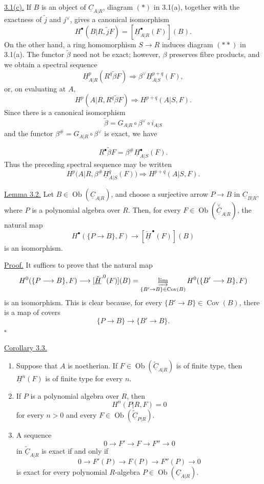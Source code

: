 \underline{3.1(c).} If $B$ is an object of
$\underline C_{A|R}$, diagram $(*)$ in 3.1(a), together with the
exactness of $\widetilde j$ and $j^{\vee}$, gives a canonical
isomorphism
\[
 H^{\bullet}(B|R,\widetilde jF)=
 [\underline H^{\bullet}_{A|R}(F)](B).
\]
On the other hand, a ring homomorphism $S\longrightarrow R$ induces
diagram $(**)$ in 3.1(a). The functor $\widetilde\beta$ need not be
exact; however, $\beta$ preserves fibre products, and we obtain a
spectral sequence
\[
 \underline H^p_{A|R}(R^q\widetilde\beta F)
 \Longrightarrow
 \beta^{\vee}\underline H^{p+q}_{A|S}(F),
\]
or, on evaluating at $A$,
\[
 H^p(A|R,R^q\widetilde\beta F)
 \Longrightarrow H^{p+q}(A|S,F).
\]
Since there is a canonical isomorphism
\[
 \widetilde\beta=
 G_{A|R}\circ\beta^{\vee}\circ i_{A|S}
\]
and the functor
$\beta^{\#}=G_{A|R}\circ\beta^{\vee}$ is exact, we have


\[
 R^{\bullet}\widetilde\beta F=
 \beta^{\#}\underline H^{\bullet}_{A|S}(F).
\]
Thus the preceding spectral sequence may be written
\[
 H^p\bigl(A|R,\beta^{\#}\underline H^q_{A|S}(F)\bigr)
 \Longrightarrow H^{p+q}(A|S,F).
\]

\underline{Lemma 3.2.} Let
$B\in\operatorname{Ob}(\underline C_{A|R})$, and choose a
surjective arrow $P\longrightarrow B$ in $\underline C_{B|R}$,
where $P$ is a polynomial algebra over $R$. Then, for every
$F\in\operatorname{Ob}(\overset{\vee}{\underline C}_{A|R})$, the
natural map
\[
 H^{\bullet}(\{P\longrightarrow B\},F)
 \longrightarrow[\check{\underline H}^{\,\bullet}(F)](B)
\]
is an isomorphism.

\underline{Proof.} It suffices to prove that the natural map
\[
 H^0(\{P\longrightarrow B\},F)
 \longrightarrow[\check{\underline H}^{,0}(F)](B)
 =\varinjlim_{\{B'\to B\}\in\operatorname{Cov}(B)}
   H^0(\{B'\longrightarrow B\},F)
\]
is an isomorphism. This is clear because, for every
$\{B'\longrightarrow B\}\in\operatorname{Cov}(B)$, there is a map
of covers
\[
 \{P\longrightarrow B\}\longrightarrow
 \{B'\longrightarrow B\}.
\]
\hfill$\square$

\underline{Corollary 3.3.}

\begin{enumerate}[label=(\alph*)]
\item Suppose that $A$ is noetherian. If
$F\in\operatorname{Ob}(\widetilde{\underline C}_{A|R})$ is of
finite type, then $\underline H^n(F)$ is of finite type for every
$n$.

\item If $P$ is a polynomial algebra over $R$, then
\[
 H^n(P|R,F)=0
\]
for every $n>0$ and every
$F\in\operatorname{Ob}(\widetilde{\underline C}_{P|R})$.

\item A sequence
\[
 0\longrightarrow F'\longrightarrow F\longrightarrow F''
 \longrightarrow0
\]
in $\widetilde{\underline C}_{A|R}$ is exact if and only if
\[
 0\longrightarrow F'(P)\longrightarrow F(P)
 \longrightarrow F''(P)\longrightarrow0
\]
is exact for every polynomial $R$-algebra
$P\in\operatorname{Ob}(\underline C_{A|R})$.
\end{enumerate}

